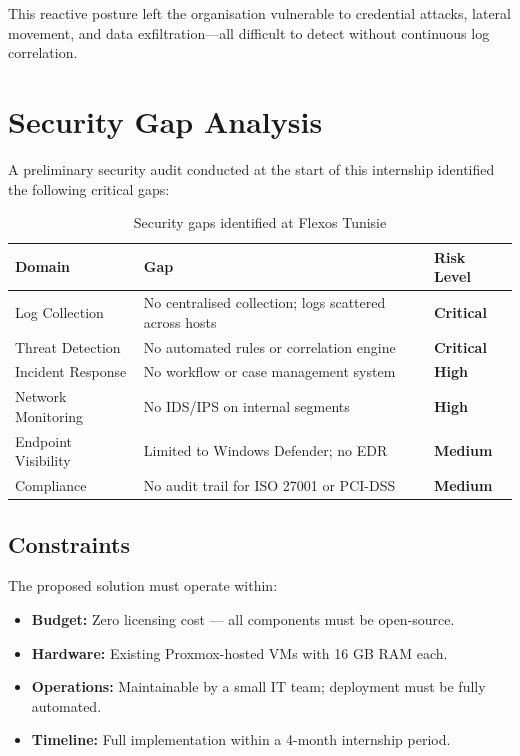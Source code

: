 \documentclass[12pt,a4paper]{report}
\begin{document}
This reactive posture left the organisation vulnerable to credential attacks, lateral movement, and data exfiltration---all difficult to detect without continuous log correlation.

\section{Security Gap Analysis}

A preliminary security audit conducted at the start of this internship identified the following critical gaps:

\begin{table}[H]
\centering
\caption{Security gaps identified at Flexos Tunisie}
\begin{tabularx}{\textwidth}{lXl}
\toprule
\textbf{Domain} & \textbf{Gap} & \textbf{Risk Level} \\
\midrule
Log Collection    & No centralised collection; logs scattered across hosts & \textcolor{alertred}{\textbf{Critical}} \\
Threat Detection  & No automated rules or correlation engine & \textcolor{alertred}{\textbf{Critical}} \\
Incident Response & No workflow or case management system & \textcolor{alertred}{\textbf{High}} \\
Network Monitoring & No IDS/IPS on internal segments & \textcolor{alertred}{\textbf{High}} \\
Endpoint Visibility & Limited to Windows Defender; no EDR & \textcolor{warnorange}{\textbf{Medium}} \\
Compliance        & No audit trail for ISO 27001 or PCI-DSS & \textcolor{warnorange}{\textbf{Medium}} \\
\bottomrule
\end{tabularx}
\label{tab:gaps}
\end{table}

\subsection{Constraints}

The proposed solution must operate within:
\begin{itemize}
  \item \textbf{Budget:} Zero licensing cost --- all components must be open-source.
  \item \textbf{Hardware:} Existing Proxmox-hosted VMs with 16 GB RAM each.
  \item \textbf{Operations:} Maintainable by a small IT team; deployment must be fully automated.
  \item \textbf{Timeline:} Full implementation within a 4-month internship period.
\end{itemize}
\end{document}
